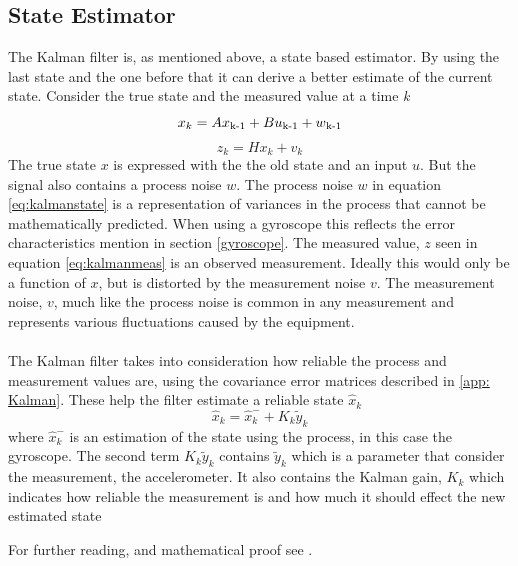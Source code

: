 \documentclass[a4paper,11pt]{kth-mag}
\begin{document}
\subsection{State Estimator}
The Kalman filter is, as mentioned above, a state based estimator. By using the last state and the one before that it can derive a better estimate of the current state. Consider the true state and the measured value at a time \textit{k}
\begin{equation}\label{eq:kalmanstate}
x_k = Ax\textsubscript{k-1}+Bu\textsubscript{k-1}+w\textsubscript{k-1}
\end{equation}
\begin{equation} \label{eq:kalmanmeas}
z_k = Hx_k + v_k
\end{equation}
The true state $x$ is expressed with the the old state and an input $u$. But the signal also contains a process noise $w$. The process noise $w$ in equation \eqref{eq:kalmanstate} is a representation of variances in the process that cannot be mathematically predicted. When using a gyroscope this reflects the error characteristics mention in section \ref{gyroscope}. 
The measured value, $z$ seen in equation \eqref{eq:kalmanmeas} is an observed measurement. Ideally this would only be a function of $x$, but is distorted by the measurement noise $v$.
The measurement noise, $v$, much like the process noise is common in any measurement and represents various fluctuations caused by the equipment.
\\ \\
The Kalman filter takes into consideration how reliable the  process and measurement values are, using the covariance error matrices described in \ref{app: Kalman}. These help the filter estimate a reliable state $\hat{x}_k$
\begin{equation}
\hat{x}_k = \hat{x}^-_k + K_k\tilde{y}_k
\end{equation}
where $\hat{x}^-_k$ is an estimation of the state using the process, in this case the gyroscope. The second term $K_k\tilde{y}_k$ contains $\tilde{y}_k$ which is a parameter that consider the measurement, the accelerometer. It also contains the Kalman gain, $K_k$ which indicates how reliable the measurement is and how much it should effect the new estimated state

For further reading, and mathematical proof see \cite{Kalmanintro}.
\end{document}
